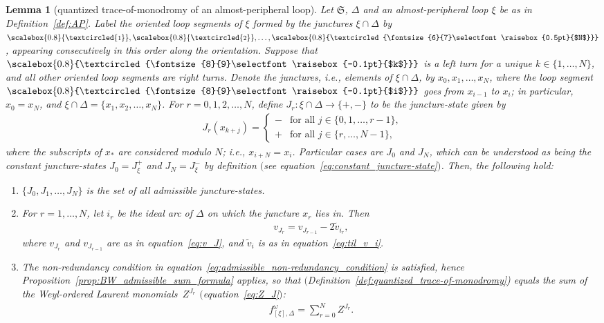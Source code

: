 \documentclass[pdftex]{sigma}
\numberwithin{equation}{section}
\newtheorem{Lemma}[Theorem]{Lemma}
\theoremstyle{definition}
\newcommand{\circled}[1]{\scalebox{0.8}{\textcircled{\fontsize{8}{9}\selectfont \raisebox{-0.1pt}{#1}}}}
\newcommand{\circledd}[1]{\scalebox{0.8}{\textcircled{\fontsize{6}{7}\selectfont \raisebox{0.5pt}{#1}}}}
\newcommand{\til}[1]{\widetilde{#1}}
\begin{document}
\begin{Lemma}[quantized trace-of-monodromy of an almost-peripheral loop]
\label{lem:AP}
Let $\mathfrak{S}$, $\Delta$ and an almost-peripheral loop $\xi$ be as in Definition~{\rm \ref{def:AP}}. Label the oriented loop segments of $\xi$ formed by the junctures $\xi \cap \Delta$ by {\rm $\circled{1}, \circled{2},\dots,\circledd{$N$}$}, appearing consecutively in this order along the orientation. Suppose that {\rm $\circled{$k$}$} is a left turn for a unique $k \in\{1,\dots,N\}$, and all other oriented loop segments are right turns.
Denote the junctures, i.e., elements of $\xi \cap \Delta$, by $x_0,x_1,\dots,x_N$, where the loop segment {\rm $\circled{$i$}$} goes from $x_{i-1}$ to $x_i$; in particular, $x_0 = x_N$, and $\xi\cap\Delta = \{x_1,x_2,\dots,x_N\}$.
For $r=0,1,2,\dots,N$, define $J_r \colon \xi \cap \Delta \to \{+,-\}$ to be the juncture-state given by
\begin{align*}
J_r(x_{k+j}) = \begin{cases}
- & \mbox{for all $j\in \{0,1,\dots,r-1\}$}, \\
+ & \mbox{for all $j\in \{r,\dots,N-1\}$},
\end{cases}
\end{align*}
where the subscripts of $x_*$ are considered modulo $N$; i.e., $x_{i+N} = x_i$. Particular cases are $J_0$ and $J_N$, which can be understood as being the constant juncture-states $J_0 = J_\xi^+$ and $J_N = J_\xi^-$ by definition $($see equation~\eqref{eq:constant_juncture-state}$)$.
Then, the following hold:
\begin{enumerate}[label={\rm (AP\arabic*)}]\itemsep=0pt\setlength{\leftskip}{0.28cm}
\item\label{AP1} $\{J_0,J_1,\dots,J_N\}$ is the set of all admissible juncture-states.
\item\label{AP2} For $r=1,\dots,N$, let $i_r$ be the ideal arc of $\Delta$ on which the juncture $x_r$ lies in. Then
\begin{align}
\label{eq:AP2}
v_{J_r} = v_{J_{r-1}} - 2 \til{v}_{i_r},
\end{align}
where $v_{J_r}$ and $v_{J_{r-1}}$ are as in equation~\eqref{eq:v_J}, and $\til{v}_i$ is as in equation~\eqref{eq:til_v_i}.
\item\label{AP3} The non-redundancy condition in equation~\eqref{eq:admissible_non-redundancy_condition} is satisfied, hence Proposition~{\rm \ref{prop:BW_admissible_sum_formula}} applies, so that  $($Definition~{\rm \ref{def:quantized_trace-of-monodromy})} equals the sum of the Weyl-ordered Laurent monomials~$Z^{J_r}$ $($equation~\eqref{eq:Z_J}$)$:
\begin{align*}
f^\omega_{[\xi],\Delta} = \sum_{r=0}^N Z^{J_r}.
\end{align*}
\end{enumerate}
\end{Lemma}
\end{document}
